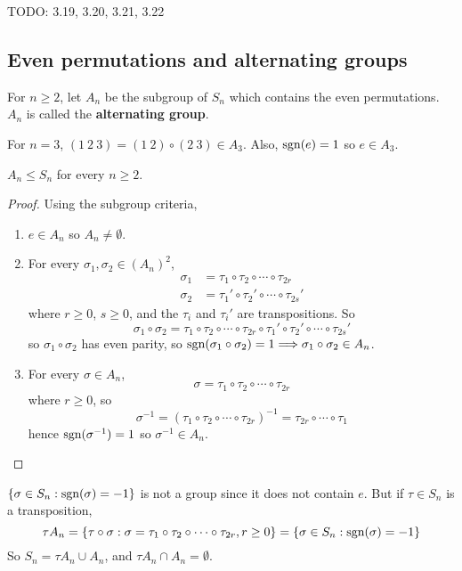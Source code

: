 TODO: 3.19, 3.20, 3.21, 3.22

\subsection{Even permutations and alternating groups}

\begin{definition}
	For $n \ge 2$, let $A_n$ be the subgroup of $S_n$ which contains the even permutations. $A_n$ is called the \textbf{alternating group}.
\end{definition}

\begin{example}
	For $n = 3$, $(1 \ 2 \ 3) = (1 \ 2) \circ (2 \ 3) \in A_3$. Also, $\text{sgn}(e) = 1$ so $e \in A_3$.
\end{example}

\begin{lemma}
	$A_n \le S_n$ for every $n \ge 2$.
\end{lemma}

\begin{proof}
	Using the subgroup criteria,
	\begin{enumerate}
		\item $e \in A_n$ so $A_n \ne \emptyset$.
		\item For every $\sigma_1, \sigma_2 \in {(A_n)}^2$,
		\[
			\begin{aligned}
				\sigma_1 & = \tau_1 \circ \tau_2 \circ \cdots \circ \tau_{2r} \\
				\sigma_2 & = \tau_1' \circ \tau_2' \circ \cdots \circ \tau_{2s}'
			\end{aligned}
		\]
		where $r \ge 0$, $s \ge 0$, and the $\tau_i$ and $\tau_i'$ are transpositions. So
		\[
			\sigma_1 \circ \sigma_2 = \tau_1 \circ \tau_2 \circ \cdots \circ \tau_{2r} \circ \tau_1' \circ \tau_2' \circ \cdots \circ \tau_{2s}'
		\]
		so $\sigma_1 \circ \sigma_2$ has even parity, so $\text{sgn}(\sigma_1 \circ \sigma_2) = 1 \Longrightarrow \sigma_1 \circ \sigma_2 \in A_n$.
		\item For every $\sigma \in A_n$,
		\[
			\sigma = \tau_1 \circ \tau_2 \circ \cdots \circ \tau_{2r}
		\]
		where $r \ge 0$, so
		\[
			\sigma^{-1} = {(\tau_1 \circ \tau_2 \circ \cdots \circ \tau_{2r})}^{-1} = \tau_{2r} \circ \cdots \circ \tau_1
		\]
		hence $\text{sgn}(\sigma^{-1}) = 1$ so $\sigma^{-1} \in A_n$.
	\end{enumerate}
\end{proof}

\begin{example}
	$\{ \sigma \in S_n: \text{sgn}(\sigma) = -1 \}$ is not a group since it does not contain $e$. But if $\tau \in S_n$ is a transposition,
	\[
		\tau A_n = \{ \tau \circ \sigma: \sigma = \tau_1 \circ \tau_2 \circ \cdots \circ \tau_{2r}, r \ge 0 \} = \{ \sigma \in S_n: \text{sgn}(\sigma) = -1 \}
	\]
	So $S_n = \tau A_n \cup A_n$, and $\tau A_n \cap A_n = \emptyset$.
\end{example}

